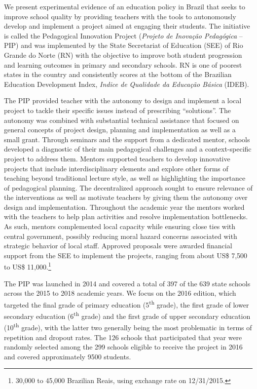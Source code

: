 \documentclass[11pt,a4paper]{article}
\begin{document}
	
	We present experimental evidence of an education policy in Brazil that seeks to improve school quality by providing teachers with the tools to autonomously develop and implement a project aimed at engaging their students. The initiative is called the Pedagogical Innovation Project (\textit{Projeto de Inovação Pedagógica} -- PIP) and was implemented by the State Secretariat of Education (SEE) of Rio Grande do Norte (RN) with the objective to improve both student progression and learning outcomes in primary and secondary schools. RN is one of poorest states in the country and consistently scores at the bottom of the Brazilian Education Development Index, \textit{Indice de Qualidade da Educação Básica} (IDEB). 
	
	
	The PIP provided teacher with the autonomy to design and implement a local project to tackle their specific issues instead of prescribing ``solutions''. The autonomy was combined with substantial technical assistance that focused on general concepts of project design, planning and implementation as well as a small grant. Through seminars and the support from a dedicated mentor, schools developed a diagnostic of their main pedagogical challenges and a context-specific project to address them. Mentors supported teachers to develop innovative projects that include interdisciplinary elements and explore other forms of teaching beyond traditional lecture style, as well as highlighting the importance of pedagogical planning. The decentralized approach sought to ensure relevance of the interventions as well as motivate teachers by giving them the autonomy over design and implementation. Throughout the academic year the mentors worked with the teachers to help plan activities and resolve implementation bottlenecks. As such, mentors complemented local capacity while ensuring close ties with central government, possibly reducing moral hazard concerns associated with strategic behavior of local staff. Approved proposals were awarded financial support from the SEE to implement the projects, ranging from about US\$ 7,500 to US\$ 11,000.\footnote{30,000 to 45,000 Brazilian Reais, using exchange rate on 12/31/2015.}
	
	
	The PIP was launched in 2014 and covered a total of 397 of the 639 state schools across the 2015 to 2018 academic years. We focus on the 2016 edition, which targeted the final grade of primary education (5\textsuperscript{th} grade), the first grade of lower secondary education (6\textsuperscript{th} grade) and the first grade of upper secondary education (10\textsuperscript{th} grade), with the latter two generally being the most problematic in terms of repetition and dropout rates. The 126 schools that participated that year were randomly selected among the 299 schools eligible to receive the project in 2016 and covered approximately 9500 students. 
	
\end{document}
